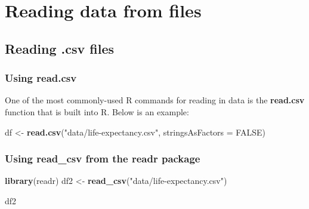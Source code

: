 \documentclass[]{book}
\newenvironment{Shaded}{\begin{snugshade}}{\end{snugshade}}
\newcommand{\DataTypeTok}[1]{\textcolor[rgb]{0.13,0.29,0.53}{#1}}
\newcommand{\KeywordTok}[1]{\textcolor[rgb]{0.13,0.29,0.53}{\textbf{#1}}}
\newcommand{\NormalTok}[1]{#1}
\newcommand{\OtherTok}[1]{\textcolor[rgb]{0.56,0.35,0.01}{#1}}
\newcommand{\StringTok}[1]{\textcolor[rgb]{0.31,0.60,0.02}{#1}}
\begin{document}
\hypertarget{file1}{%
\chapter{Reading data from files}\label{file1}}

\hypertarget{readdotcsv}{%
\section*{Reading .csv files}\label{readdotcsv}}

\hypertarget{basecsv}{%
\subsection*{\texorpdfstring{Using \textbf{read.csv}}{Using read.csv}}\label{basecsv}}

One of the most commonly-used R commands for reading in data is the \textbf{read.csv} function that is built into R. Below is an example:

\begin{Shaded}
\begin{Highlighting}[]
\NormalTok{df <-}\StringTok{ }\KeywordTok{read.csv}\NormalTok{(}\StringTok{"data/life-expectancy.csv"}\NormalTok{, }\DataTypeTok{stringsAsFactors =} \OtherTok{FALSE}\NormalTok{)}
\end{Highlighting}
\end{Shaded}

\hypertarget{readrcsv}{%
\subsection*{\texorpdfstring{Using \textbf{read\_csv} from the \textbf{readr} package}{Using read\_csv from the readr package}}\label{readrcsv}}

\begin{Shaded}
\begin{Highlighting}[]
\KeywordTok{library}\NormalTok{(readr)}
\NormalTok{df2 <-}\StringTok{ }\KeywordTok{read_csv}\NormalTok{(}\StringTok{"data/life-expectancy.csv"}\NormalTok{)}
\end{Highlighting}
\end{Shaded}

\begin{Shaded}
\begin{Highlighting}[]
\NormalTok{df2}
\end{Highlighting}
\end{Shaded}
\end{document}
